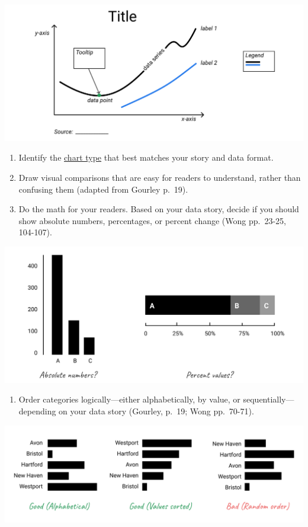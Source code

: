 \documentclass[
  english,
]{book}
\providecommand{\tightlist}{%
  \setlength{\itemsep}{0pt}\setlength{\parskip}{0pt}}
\begin{document}
\includegraphics{images/05-chart/Chart - 4 - Vocabulary.png}

\begin{enumerate}
\def\labelenumi{\arabic{enumi})}
\setcounter{enumi}{4}
\item
  Identify the \href{chart}{chart type} that best matches your story and data format.
\item
  Draw visual comparisons that are easy for readers to understand, rather than confusing them (adapted from Gourley p.~19).
\item
  Do the math for your readers. Based on your data story, decide if you should show absolute numbers, percentages, or percent change (Wong pp.~23-25, 104-107).
\end{enumerate}

\includegraphics{images/05-chart/Chart - 7 - Do the math.png}

\begin{enumerate}
\def\labelenumi{\arabic{enumi})}
\setcounter{enumi}{7}
\tightlist
\item
  Order categories logically---either alphabetically, by value, or sequentially---depending on your data story (Gourley, p.~19; Wong pp.~70-71).
\end{enumerate}

\includegraphics{images/05-chart/Chart - 8 - Order.png}
\end{document}
